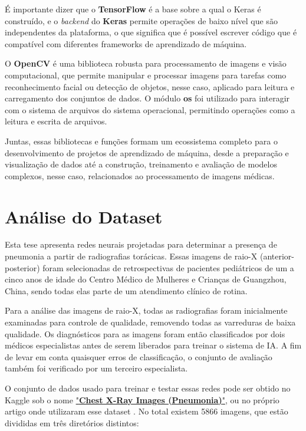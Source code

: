 É importante dizer que o \textbf{TensorFlow} é a base sobre a qual o Keras é construído, e o \textit{backend} do \textbf{Keras} permite operações de baixo nível que são independentes da plataforma, o que significa que é possível escrever código que é compatível com diferentes frameworks de aprendizado de máquina.

O \textbf{OpenCV} é uma biblioteca robusta para processamento de imagens e visão computacional, que permite manipular e processar imagens para tarefas como reconhecimento facial ou detecção de objetos, nesse caso, aplicado para leitura e carregamento dos conjuntos de dados. O módulo \textbf{os} foi utilizado para interagir com o sistema de arquivos do sistema operacional, permitindo operações como a leitura e escrita de arquivos.

Juntas, essas bibliotecas e funções formam um ecossistema completo para o desenvolvimento de projetos de aprendizado de máquina, desde a preparação e visualização de dados até a construção, treinamento e avaliação de modelos complexos, nesse caso, relacionados ao processamento de imagens médicas.


\section{Análise do Dataset}


Esta tese apresenta redes neurais projetadas para determinar a presença de pneumonia a partir de radiografias torácicas. Essas imagens de raio-X (anterior-posterior) foram selecionadas de retrospectivas de pacientes pediátricos de um a cinco anos de idade do Centro Médico de Mulheres e Crianças de Guangzhou, China, sendo todas elas parte de um atendimento clínico de rotina.

Para a análise das imagens de raio-X, todas as radiografias foram inicialmente examinadas para controle de qualidade, removendo todas as varreduras de baixa qualidade. Os diagnósticos para as imagens foram então classificados por dois médicos especialistas antes de serem liberados para treinar o sistema de IA. A fim de levar em conta quaisquer erros de classificação, o conjunto de avaliação também foi verificado por um terceiro especialista. 

O conjunto de dados usado para treinar e testar essas redes pode ser obtido no Kaggle sob o nome \href{https://www.kaggle.com/datasets/paultimothymooney/chest-xray-pneumonia/data}{"\textbf{Chest X-Ray Images (Pneumonia)}"}, ou no próprio artigo onde utilizaram esse dataset \cite{Kermany2018}. No total existem 5866 imagens, que estão divididas em três diretórios distintos:

